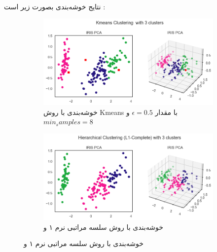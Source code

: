 \documentclass[a4paper, 12pt]{article}
\begin{document}
	
	 نتایج خوشه‌بندی بصورت زیر است :
	
	\begin{figure}[H]
		
		\begin{subfigure}[t]{0.4\textwidth}
		\centering
		\includegraphics[width=\linewidth]{fig9.png}
		\caption{
			خوشه‌بندی با روش Kmeans  با مقدار 
			$\epsilon = 0.5$
			و
			$min_samples = 8$	
		}
	\end{subfigure}
	\hfill
	\begin{subfigure}[t]{.4\textwidth}
		\centering
		\includegraphics[width=\linewidth]{fig6.png}
		\caption{
			خوشه‌بندی با روش سلسه مراتبی نرم ۱ و 
		}
	\end{subfigure}
	
	\medskip
	

\end{figure}
\end{document}
